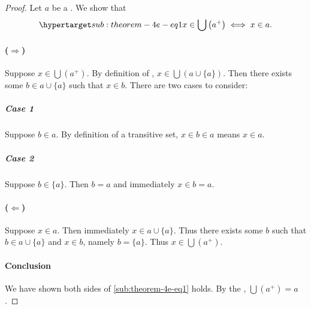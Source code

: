 \documentclass{report}
\begin{document}
  \begin{proof}

    Let $a$ be a .
    We show that
      \begin{equation}
        \hyperlabel{sub:theorem-4e-eq1}
        x \in \bigcup \left(a^+\right) \iff x \in a.
      \end{equation}

    \paragraph{($\Rightarrow$)}%

      Suppose $x \in \bigcup \left(a^+\right)$.
      By definition of ,
        $x \in \bigcup \left(a \cup \{a\}\right)$.
      Then there exists some $b \in a \cup \{a\}$ such that $x \in b$.
      There are two cases to consider:

      \subparagraph{Case 1}%

        Suppose $b \in a$.
        By definition of a transitive set, $x \in b \in a$ means $x \in a$.

      \subparagraph{Case 2}%

        Suppose $b \in \{a\}$.
        Then $b = a$ and immediately $x \in b = a$.

    \paragraph{($\Leftarrow$)}%

      Suppose $x \in a$.
      Then immediately $x \in a \cup \{a\}$.
      Thus there exists some $b$ such that $b \in a \cup \{a\}$ and $x \in b$,
        namely $b = \{a\}$.
      Thus $x \in \bigcup \left(a^+\right)$.

    \paragraph{Conclusion}%

      We have shown both sides of \eqref{sub:theorem-4e-eq1} holds.
      By the , $\bigcup \left(a^+\right) = a$.

  \end{proof}

\subsection{}%
\end{document}
